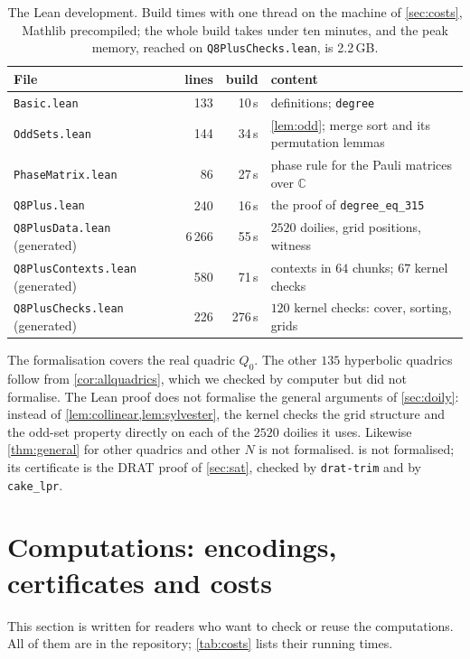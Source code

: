 \documentclass[11pt]{article}
\theoremstyle{definition}
\theoremstyle{remark}
\begin{document}
\begin{table}[ht]
\centering\small
\begin{tabular}{@{}lrrl@{}}
\toprule
File & lines & build & content \\
\midrule
\texttt{Basic.lean} & 133 & 10\,s & definitions; \texttt{degree} \\
\texttt{OddSets.lean} & 144 & 34\,s & \cref{lem:odd}; merge sort and its permutation lemmas \\
\texttt{PhaseMatrix.lean} & 86 & 27\,s & phase rule for the Pauli matrices over $\mathbb C$ \\
\texttt{Q8Plus.lean} & 240 & 16\,s & the proof of \texttt{degree\_eq\_315} \\
\texttt{Q8PlusData.lean} (generated) & 6\,266 & 55\,s & $2520$ doilies, grid positions, witness \\
\texttt{Q8PlusContexts.lean} (generated) & 580 & 71\,s & contexts in $64$ chunks; $67$ kernel checks \\
\texttt{Q8PlusChecks.lean} (generated) & 226 & 276\,s & $120$ kernel checks: cover, sorting, grids \\
\bottomrule
\end{tabular}
\caption{The Lean development. Build times with one thread on the machine of \cref{sec:costs}, Mathlib precompiled; the whole build takes under ten minutes, and the peak memory, reached on \texttt{Q8PlusChecks.lean}, is 2.2\,GB.}
\label{tab:lean}
\end{table}

The formalisation covers the real quadric $Q_0$. The other $135$ hyperbolic quadrics follow from \cref{cor:allquadrics}, which we checked by computer but did not formalise.
The Lean proof does not formalise the general arguments of \cref{sec:doily}: instead of \cref{lem:collinear,lem:sylvester}, the kernel checks the grid structure and the odd-set property directly on each of the $2520$ doilies it uses. Likewise \cref{thm:general} for other quadrics and other $N$ is not formalised.
 is not formalised; its certificate is the DRAT proof of \cref{sec:sat}, checked by \texttt{drat-trim} and by \texttt{cake\_lpr}.

\section{Computations: encodings, certificates and costs}\label{sec:computations}
This section is written for readers who want to check or reuse the computations. All of them are in the repository; \cref{tab:costs} lists their running times.
\end{document}
